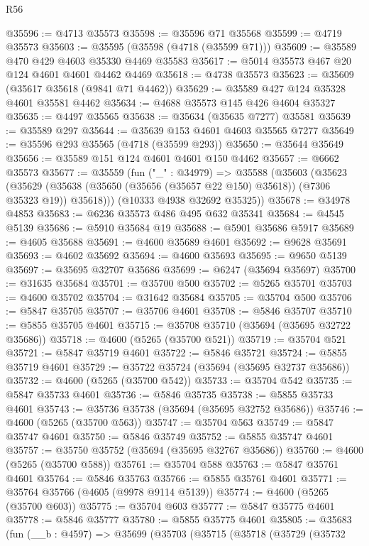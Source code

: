 \begin{lexlean}{R56}
\begin{coremodule}
@35596 := @4713 @35573
@35598 := @35596 @71 @35568
@35599 := @4719 @35573
@35603 := @35595 (@35598 (@4718 (@35599 @71)))
@35609 := @35589 @470 @429 @4603 @35330 @4469 @35583
@35617 := @5014 @35573 @467 @20 @124 @4601 @4601 @4462 @4469
@35618 := @4738 @35573
@35623 := @35609 (@35617 @35618 (@9841 @71 @4462))
@35629 := @35589 @427 @124 @35328 @4601 @35581 @4462
@35634 := @4688 @35573 @145 @426 @4604 @35327
@35635 := @4497 @35565
@35638 := @35634 (@35635 @7277) @35581
@35639 := @35589 @297
@35644 := @35639 @153 @4601 @4603 @35565 @7277
@35649 := @35596 @293 @35565 (@4718 (@35599 @293))
@35650 := @35644 @35649
@35656 := @35589 @151 @124 @4601 @4601 @150 @4462
@35657 := @6662 @35573
@35677 := @35559
    (fun ("_" : @34979) =>
    @35588
      (@35603
        (@35623
          (@35629 (@35638 (@35650 (@35656 (@35657 @22 @150) @35618)) (@7306 @35323 @19)) @35618)))
      (@10333 @4938 @32692 @35325))
@35678 := @34978 @4853
@35683 := @6236 @35573 @486 @495 @632 @35341
@35684 := @4545 @5139
@35686 := @5910 @35684 @19
@35688 := @5901 @35686 @5917
@35689 := @4605 @35688
@35691 := @4600 @35689 @4601
@35692 := @9628 @35691
@35693 := @4602 @35692
@35694 := @4600 @35693
@35695 := @9650 @5139
@35697 := @35695 @32707 @35686
@35699 := @6247 (@35694 @35697)
@35700 := @31635 @35684
@35701 := @35700 @500
@35702 := @5265 @35701
@35703 := @4600 @35702
@35704 := @31642 @35684
@35705 := @35704 @500
@35706 := @5847 @35705
@35707 := @35706 @4601
@35708 := @5846 @35707
@35710 := @5855 @35705 @4601
@35715 := @35708 @35710 (@35694 (@35695 @32722 @35686))
@35718 := @4600 (@5265 (@35700 @521))
@35719 := @35704 @521
@35721 := @5847 @35719 @4601
@35722 := @5846 @35721
@35724 := @5855 @35719 @4601
@35729 := @35722 @35724 (@35694 (@35695 @32737 @35686))
@35732 := @4600 (@5265 (@35700 @542))
@35733 := @35704 @542
@35735 := @5847 @35733 @4601
@35736 := @5846 @35735
@35738 := @5855 @35733 @4601
@35743 := @35736 @35738 (@35694 (@35695 @32752 @35686))
@35746 := @4600 (@5265 (@35700 @563))
@35747 := @35704 @563
@35749 := @5847 @35747 @4601
@35750 := @5846 @35749
@35752 := @5855 @35747 @4601
@35757 := @35750 @35752 (@35694 (@35695 @32767 @35686))
@35760 := @4600 (@5265 (@35700 @588))
@35761 := @35704 @588
@35763 := @5847 @35761 @4601
@35764 := @5846 @35763
@35766 := @5855 @35761 @4601
@35771 := @35764 @35766 (@4605 (@9978 @9114 @5139))
@35774 := @4600 (@5265 (@35700 @603))
@35775 := @35704 @603
@35777 := @5847 @35775 @4601
@35778 := @5846 @35777
@35780 := @5855 @35775 @4601
@35805 := @35683
    (fun (__b : @4597) =>
    @35699
      (@35703
        (@35715
          (@35718
            (@35729
              (@35732

\end{coremodule}
\end{lexlean}

